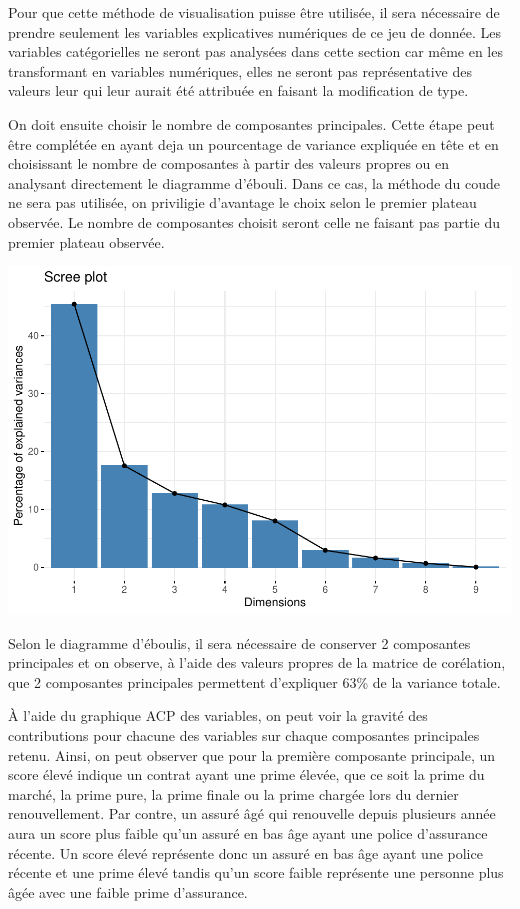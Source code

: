 \documentclass[
]{article}
\begin{document}
Pour que cette méthode de visualisation puisse être utilisée, il sera
nécessaire de prendre seulement les variables explicatives numériques de
ce jeu de donnée. Les variables catégorielles ne seront pas analysées
dans cette section car même en les transformant en variables numériques,
elles ne seront pas représentative des valeurs leur qui leur aurait été
attribuée en faisant la modification de type.

On doit ensuite choisir le nombre de composantes principales. Cette
étape peut être complétée en ayant deja un pourcentage de variance
expliquée en tête et en choisissant le nombre de composantes à partir
des valeurs propres ou en analysant directement le diagramme d'ébouli.
Dans ce cas, la méthode du coude ne sera pas utilisée, on priviligie
d'avantage le choix selon le premier plateau observée. Le nombre de
composantes choisit seront celle ne faisant pas partie du premier
plateau observée.

\includegraphics{01-01-Pretraitement_files/figure-latex/unnamed-chunk-3-1.pdf}

Selon le diagramme d'éboulis, il sera nécessaire de conserver 2
composantes principales et on observe, à l'aide des valeurs propres de
la matrice de corélation, que 2 composantes principales permettent
d'expliquer 63\% de la variance totale.

À l'aide du graphique ACP des variables, on peut voir la gravité des
contributions pour chacune des variables sur chaque composantes
principales retenu. Ainsi, on peut observer que pour la première
composante principale, un score élevé indique un contrat ayant une prime
élevée, que ce soit la prime du marché, la prime pure, la prime finale
ou la prime chargée lors du dernier renouvellement. Par contre, un
assuré âgé qui renouvelle depuis plusieurs année aura un score plus
faible qu'un assuré en bas âge ayant une police d'assurance récente. Un
score élevé représente donc un assuré en bas âge ayant une police
récente et une prime élevé tandis qu'un score faible représente une
personne plus âgée avec une faible prime d'assurance.
\end{document}
